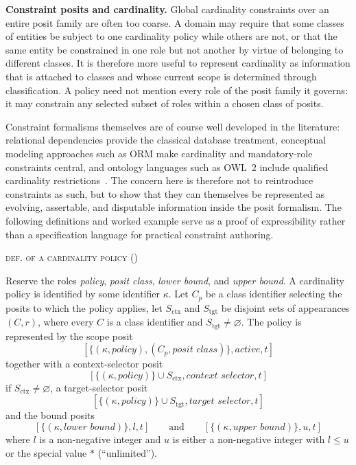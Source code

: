 \documentclass[a4paper,fleqn]{cas-sc}
\newcounter{majorcount}
\newcommand{\deffy}[3]{
	\vspace{2ex}
	\refstepcounter{majorcount}
	\noindent\textsc{#1} {\normalfont(\arabic{majorcount})}
	\\\begin{small}
	\noindent #2%
	\label{Def:#3}
	\end{small}
	\vspace{2ex}
}
\begin{document}
\textbf{Constraint posits and cardinality.}
Global cardinality constraints over an entire posit family are often too coarse. A domain may require that some classes of entities be subject to one cardinality policy while others are not, or that the same entity be constrained in one role but not another by virtue of belonging to different classes. It is therefore more useful to represent cardinality as information that is attached to classes and whose current scope is determined through classification. A policy need not mention every role of the posit family it governs: it may constrain any selected subset of roles within a chosen class of posits.

Constraint formalisms themselves are of course well developed in the literature: relational dependencies provide the classical database treatment, conceptual modeling approaches such as ORM make cardinality and mandatory-role constraints central, and ontology languages such as OWL~2 include qualified cardinality restrictions~\cite{AbiteboulEtAl,HalpinMorgan,OWL2}. The concern here is therefore not to reintroduce constraints as such, but to show that they can themselves be represented as evolving, assertable, and disputable information inside the posit formalism. The following definitions and worked example serve as a proof of expressibility rather than a specification language for practical constraint authoring.

\deffy{def. of a cardinality policy}{%
Reserve the roles \textit{policy}, \textit{posit class}, \textit{lower bound}, and \textit{upper bound}. A cardinality policy is identified by some identifier \(\kappa\). Let \(C_p\) be a class identifier selecting the posits to which the policy applies, let \(S_{\mathrm{ctx}}\) and \(S_{\mathrm{tgt}}\) be disjoint sets of appearances \((C, r)\), where every \(C\) is a class identifier and \(S_{\mathrm{tgt}}\neq\varnothing\). The policy is represented by the scope posit
\[
[\{(\kappa, \textit{policy}), (C_p, \textit{posit class})\}, \textit{active}, t]
\]
together with a context-selector posit
\[
[\{(\kappa, \textit{policy})\} \cup S_{\mathrm{ctx}}, \textit{context selector}, t]
\]
if \(S_{\mathrm{ctx}} \neq \varnothing\), a target-selector posit
\[
[\{(\kappa, \textit{policy})\} \cup S_{\mathrm{tgt}}, \textit{target selector}, t]
\]
and the bound posits
\[
[\{(\kappa, \textit{lower bound})\}, l, t]
\qquad\text{and}\qquad
[\{(\kappa, \textit{upper bound})\}, u, t]
\]
where \(l\) is a non-negative integer and \(u\) is either a non-negative integer with \(l \leq u\) or the special value \(*\) (``unlimited'').}{policy}
\end{document}
